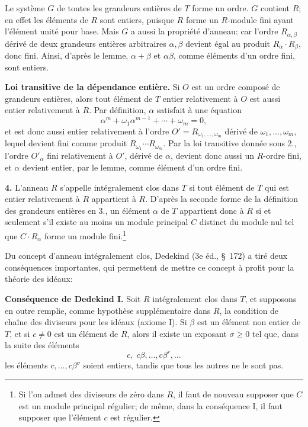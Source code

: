 Le système $G$ de toutes les grandeurs entières de $T$ forme un ordre. $G$ contient $R$; en effet les éléments de $R$ sont entiers, puisque $R$ forme un $R$-module fini ayant l'élément unité pour base. Mais $G$ a aussi la propriété d'anneau: car l'ordre $R_{\alpha,\beta}$ dérivé de deux grandeurs entières arbitraires $\alpha,\beta$ devient égal au produit $R_\alpha\cdot R_\beta$, donc fini. Ainsi, d'après le lemme, $\alpha+\beta$ et $\alpha\beta$, comme éléments d'un ordre fini, sont entiers.

\medskip
\noindent\textbf{Loi transitive de la dépendance entière.} Si $O$ est un ordre composé de grandeurs entières, alors tout élément de $T$ entier relativement à $O$ est aussi entier relativement à $R$. Par définition, $\alpha$ satisfait à une équation
\[
        \alpha^m+\omega_1\alpha^{m-1}+\cdots+\omega_m=0,
\]
et est donc aussi entier relativement à l'ordre $O'=R_{\omega_1,\ldots,\omega_m}$ dérivé de $\omega_1,\ldots,\omega_m$, lequel devient fini comme produit $R_{\omega_1}\cdots R_{\omega_m}$. Par la loi transitive donnée sous 2., l'ordre $O'_\alpha$ fini relativement à $O'$, dérivé de $\alpha$, devient donc aussi un $R$-ordre fini, et $\alpha$ devient entier, par le lemme, comme élément d'un ordre fini.

\textbf{4.} L'anneau $R$ s'appelle intégralement clos dans $T$ si tout élément de $T$ qui est entier relativement à $R$ appartient à $R$. D'après la seconde forme de la définition des grandeurs entières en 3., un élément $\alpha$ de $T$ appartient donc à $R$ si et seulement s'il existe au moins un module principal $C$ distinct du module nul tel que $C\cdot R_\alpha$ forme un module fini.\footnote{Si l'on admet des diviseurs de zéro dans $R$, il faut de nouveau supposer que $C$ est un module principal régulier; de même, dans la conséquence I, il faut supposer que l'élément $c$ est régulier.}

Du concept d'anneau intégralement clos, Dedekind (3e éd., \S~172) a tiré deux conséquences importantes, qui permettent de mettre ce concept à profit pour la théorie des idéaux:

\medskip
\noindent\textbf{Conséquence de Dedekind I.} Soit $R$ intégralement clos dans $T$, et supposons en outre remplie, comme hypothèse supplémentaire dans $R$, la condition de chaîne des diviseurs pour les idéaux (axiome I). Si $\beta$ est un élément non entier de $T$, et si $c\ne0$ est un élément de $R$, alors il existe un exposant $\sigma\ge0$ tel que, dans la suite des éléments
\[
        c,\;c\beta,\ldots,c\beta^r,\ldots
\]
les éléments $c,\ldots,c\beta^\sigma$ soient entiers, tandis que tous les autres ne le sont pas.

